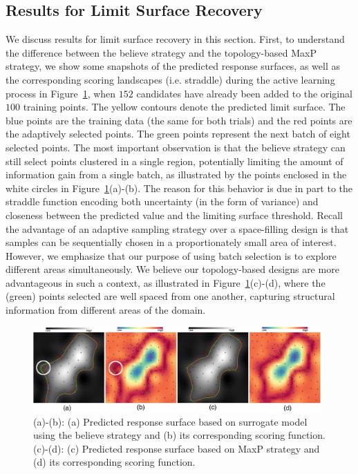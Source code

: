 \subsection{Results for Limit Surface Recovery}
\label{sec:limit_results}
We discuss results for limit surface recovery in this section.
%
First, to understand the difference between the believe strategy and the topology-based MaxP strategy, we show some snapshots of the predicted response surfaces, as well as the corresponding scoring landscapes  (i.e. straddle) during the active learning process in Figure~\ref{fig:exampleLimits}, when $152$ candidates have already been added to the original $100$ training points.
%
The yellow contours denote the predicted limit surface.
%
The blue points are the training data (the same for both trials) and the red points are the adaptively selected points.
%
The green points represent the next batch of eight selected points.
%
The most important observation is that the believe strategy can still select points clustered in a single region, potentially limiting the amount of information gain from a single batch, as illustrated by the points enclosed in the white circles in Figure~\ref{fig:exampleLimits}(a)-(b).
%
The reason for this behavior is due in part to the straddle function encoding both uncertainty (in the form of variance) and closeness between the predicted value and the limiting surface threshold.
%
Recall the advantage of an adaptive sampling strategy over a space-filling design is that samples can be sequentially chosen in a proportionately small area of interest.
%
However, we emphasize that our purpose of using batch selection is to explore different areas simultaneously.
%
We believe our topology-based designs are more advantageous in such a context, as illustrated in Figure~\ref{fig:exampleLimits}(c)-(d), where the (green) points selected are well spaced from one another, capturing structural information from different areas of the domain.

\begin{figure}[!ht]
\centering
\includegraphics[width=0.98\textwidth]{figs/chap5/example-limits}
\caption{(a)-(b): (a) Predicted response surface based on surrogate model using
the believe strategy and (b) its corresponding scoring function.
%
(c)-(d): (c) Predicted response surface based on MaxP strategy and (d) its
corresponding scoring function.}
\label{fig:exampleLimits}
\end{figure}

